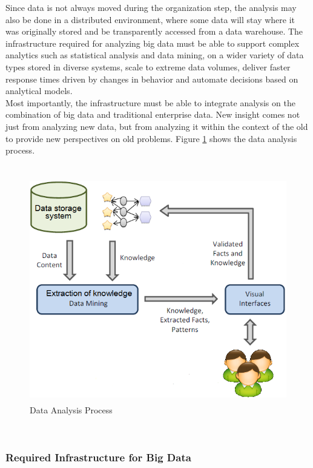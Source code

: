 Since data is not always moved during the organization step, the analysis may also be done in a distributed environment, where some data will stay where it was
originally stored and be transparently accessed from a data warehouse. The infrastructure required for analyzing big
data must be able to support complex analytics such as statistical analysis and data mining, on a wider variety of
data types stored in diverse systems, scale to extreme data volumes, deliver faster response times driven by changes in
behavior and automate decisions based on analytical models.\\

Most importantly, the infrastructure must be able to integrate analysis on the combination of big data and traditional enterprise data. New insight comes not just from analyzing new data, but from analyzing it within the context of the old to provide new perspectives on old problems. Figure \ref{process} shows the data analysis process.\\

~\\

\begin{figure}[!ht]
\begin{center}
\includegraphics[width=15cm,height=9.8cm]{chapter2/fig9.png}
\end{center}
\caption{Data Analysis Process}
\label{process}
\end{figure}
~\\
\subsubsection{Required Infrastructure for Big Data}

